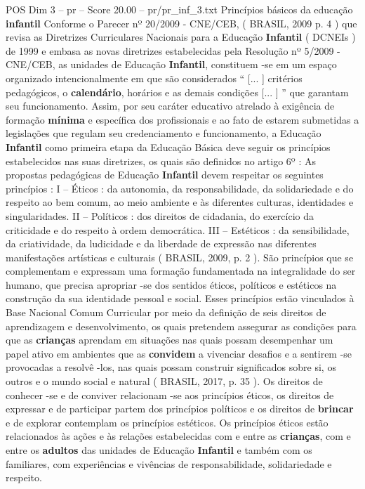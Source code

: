 \begin{textsample}{POS Dim 3 – pr – Score 20.00 – pr/pr\_inf\_3.txt}  \label{ex:f3_pos_155}
Princípios básicos da educação \textbf{infantil} Conforme o Parecer nº 20/2009 - CNE/CEB, ( BRASIL, 2009 p. 4 ) que revisa as Diretrizes Curriculares Nacionais para a Educação \textbf{Infantil} ( DCNEIs ) de 1999 e embasa as novas diretrizes estabelecidas pela Resolução nº 5/2009 - CNE/CEB, as unidades de Educação \textbf{Infantil}, constituem -se em um espaço organizado intencionalmente em que são considerados “ [... ] critérios pedagógicos, o \textbf{calendário}, horários e as demais condições [... ] ” que garantam seu funcionamento.
Assim, por seu caráter educativo atrelado à exigência de formação \textbf{mínima} e específica dos profissionais e ao fato de estarem submetidas a legislações que regulam seu credenciamento e funcionamento, a Educação \textbf{Infantil} como primeira etapa da Educação Básica deve seguir os princípios estabelecidos nas suas diretrizes, os quais são definidos no artigo 6º : As propostas pedagógicas de Educação \textbf{Infantil} devem respeitar os seguintes princípios : I – Éticos : da autonomia, da responsabilidade, da solidariedade e do respeito ao bem comum, ao meio ambiente e às diferentes culturas, identidades e singularidades.
II – Políticos : dos direitos de cidadania, do exercício da criticidade e do respeito à ordem democrática.
III – Estéticos : da sensibilidade, da criatividade, da ludicidade e da liberdade de expressão nas diferentes manifestações artísticas e culturais ( BRASIL, 2009, p. 2 ).
São princípios que se complementam e expressam uma formação fundamentada na integralidade do ser humano, que precisa apropriar -se dos sentidos éticos, políticos e estéticos na construção da sua identidade pessoal e social.
Esses princípios estão vinculados à Base Nacional Comum Curricular por meio da definição de seis direitos de aprendizagem e desenvolvimento, os quais pretendem assegurar as condições para que as \textbf{crianças} aprendam em situações nas quais possam desempenhar um papel ativo em ambientes que as \textbf{convidem} a vivenciar desafios e a sentirem -se provocadas a resolvê -los, nas quais possam construir significados sobre si, os outros e o mundo social e natural ( BRASIL, 2017, p. 35 ).
Os direitos de conhecer -se e de conviver relacionam -se aos princípios éticos, os direitos de expressar e de participar partem dos princípios políticos e os direitos de \textbf{brincar} e de explorar contemplam os princípios estéticos.
Os princípios éticos estão relacionados às ações e às relações estabelecidas com e entre as \textbf{crianças}, com e entre os \textbf{adultos} das unidades de Educação \textbf{Infantil} e também com os familiares, com experiências e vivências de responsabilidade, solidariedade e respeito.

\end{textsample}
